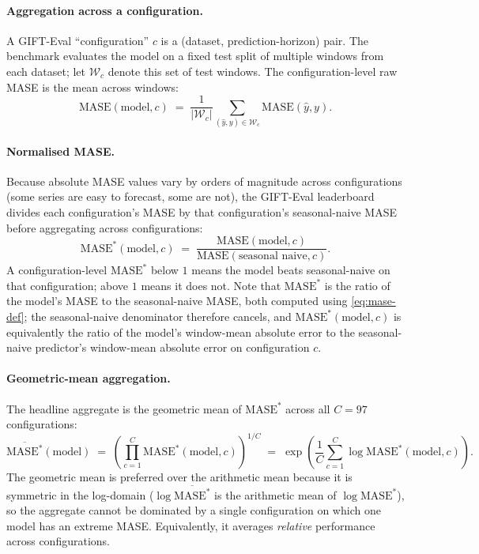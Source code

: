 \documentclass[11pt]{article}
\theoremstyle{plain}
\theoremstyle{definition}
\theoremstyle{remark}
\newcommand{\abs}[1]{\left\lvert#1\right\rvert}
\begin{document}
\paragraph{Aggregation across a configuration.}
A GIFT-Eval ``configuration'' $c$ is a (dataset, prediction-horizon) pair. The benchmark evaluates the model on a fixed test split of multiple windows from each dataset; let $\mathcal{W}_c$ denote this set of test windows. The configuration-level raw MASE is the mean across windows:
\begin{equation}
    \mathrm{MASE}(\text{model}, c) \;=\; \frac{1}{\abs{\mathcal{W}_c}} \sum_{(\hat y, y) \in \mathcal{W}_c} \mathrm{MASE}(\hat y, y).
\end{equation}

\paragraph{Normalised MASE.}
Because absolute MASE values vary by orders of magnitude across configurations (some series are easy to forecast, some are not), the GIFT-Eval leaderboard divides each configuration's MASE by that configuration's seasonal-naive MASE before aggregating across configurations:
\begin{equation}
    \mathrm{MASE}^*(\text{model}, c) \;=\; \frac{\mathrm{MASE}(\text{model}, c)}{\mathrm{MASE}(\text{seasonal naive}, c)}.
    \label{eq:normalised-mase}
\end{equation}
A configuration-level $\mathrm{MASE}^*$ below $1$ means the model beats seasonal-naive on that configuration; above $1$ means it does not. Note that $\mathrm{MASE}^*$ is the ratio of the model's MASE to the seasonal-naive MASE, both computed using \eqref{eq:mase-def}; the seasonal-naive denominator therefore cancels, and $\mathrm{MASE}^*(\text{model}, c)$ is equivalently the ratio of the model's window-mean absolute error to the seasonal-naive predictor's window-mean absolute error on configuration $c$.

\paragraph{Geometric-mean aggregation.}
The headline aggregate is the geometric mean of $\mathrm{MASE}^*$ across all $C = 97$ configurations:
\begin{equation}
    \overline{\mathrm{MASE}^*}(\text{model}) \;=\; \left(\prod_{c=1}^{C} \mathrm{MASE}^*(\text{model}, c)\right)^{1/C} \;=\; \exp\!\left(\frac{1}{C}\sum_{c=1}^{C} \log \mathrm{MASE}^*(\text{model}, c)\right).
    \label{eq:geomean}
\end{equation}
The geometric mean is preferred over the arithmetic mean because it is symmetric in the log-domain ($\log\overline{\mathrm{MASE}^*}$ is the arithmetic mean of $\log\mathrm{MASE}^*$), so the aggregate cannot be dominated by a single configuration on which one model has an extreme MASE. Equivalently, it averages \emph{relative} performance across configurations. 
\end{document}
